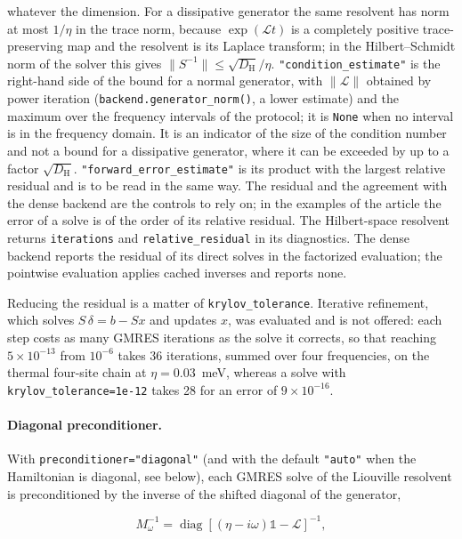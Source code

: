 \documentclass[11pt]{article}
\begin{document}
whatever the dimension. For a dissipative generator the same resolvent has norm at most $1/\eta$ in the trace norm, because $\exp(\mathcal{L}t)$ is a completely positive trace-preserving map and the resolvent is its Laplace transform; in the Hilbert--Schmidt norm of the solver this gives $\|S^{-1}\|\leq\sqrt{D_{\mathrm H}}/\eta$. \texttt{"condition\_estimate"} is the right-hand side of the bound for a normal generator, with $\|\mathcal{L}\|$ obtained by power iteration (\texttt{backend.generator\_norm()}, a lower estimate) and the maximum over the frequency intervals of the protocol; it is \texttt{None} when no interval is in the frequency domain. It is an indicator of the size of the condition number and not a bound for a dissipative generator, where it can be exceeded by up to a factor $\sqrt{D_{\mathrm H}}$. \texttt{"forward\_error\_estimate"} is its product with the largest relative residual and is to be read in the same way. The residual and the agreement with the dense backend are the controls to rely on; in the examples of the article the error of a solve is of the order of its relative residual. The Hilbert-space resolvent returns \texttt{iterations} and \texttt{relative\_residual} in its diagnostics. The dense backend reports the residual of its direct solves in the factorized evaluation; the pointwise evaluation applies cached inverses and reports none.

Reducing the residual is a matter of \texttt{krylov\_tolerance}. Iterative refinement, which solves $S\,\delta=b-Sx$ and updates $x$, was evaluated and is not offered: each step costs as many GMRES iterations as the solve it corrects, so that reaching $5\times10^{-13}$ from $10^{-6}$ takes 36 iterations, summed over four frequencies, on the thermal four-site chain at $\eta=0.03$~meV, whereas a solve with \texttt{krylov\_tolerance=1e-12} takes 28 for an error of $9\times10^{-16}$.

\paragraph{Diagonal preconditioner.}
With \texttt{preconditioner="diagonal"} (and with the default \texttt{"auto"} when the Hamiltonian is diagonal, see below), each GMRES solve of the Liouville
resolvent is preconditioned by the inverse of the shifted diagonal of the
generator,

\begin{equation}
M_\omega^{-1}
=
\operatorname{diag}\!\left[
(\eta-i\omega)\mathbb{1}-\mathcal{L}
\right]^{-1},
\end{equation}
\end{document}
